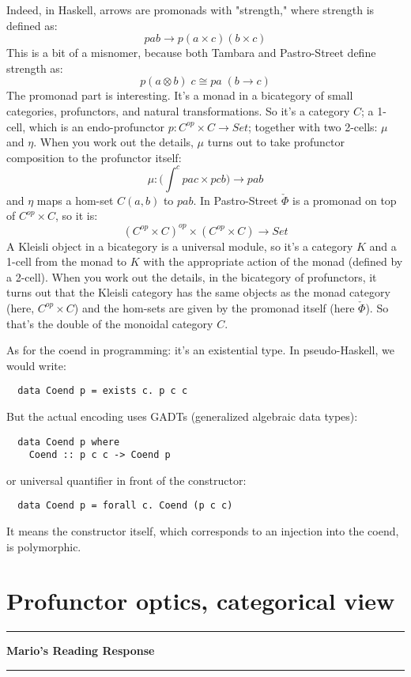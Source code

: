 \documentclass{amsart}
\newcommand{\iam}[1]{
  \vspace{0.25em}
  \hrule
  \vspace{0.25em}
  \textbf{{#1}'s Reading Response}
  \vspace{0.25em}
  \hrule
  \vspace{1em}
}
\begin{document}
Indeed, in Haskell, arrows are promonads with "strength," where strength is defined as:
\[p a b \to p (a \times c) (b \times c)\]
This is a bit of a misnomer, because both Tambara and Pastro-Street define strength as:
\[p (a \otimes b)\; c \cong p a\; (b \to c)\]
The promonad part is interesting. It's a monad in a bicategory of small categories, profunctors, and natural transformations. So it's a category $C$; a 1-cell, which is an endo-profunctor $p : C^{op}\times C \to Set$; together with two 2-cells: $\mu$ and $\eta$. When you work out the details, $\mu$ turns out to take profunctor composition to the profunctor itself:
\[\mu : \Big(\int^c p a c \times p c b\Big) \to p a b\]
and $\eta$ maps a hom-set $C(a, b)$ to $p a b$. In Pastro-Street $\check{\Phi}$ is a promonad on top of $C^{op}\times C$, so it is:
\[(C^{op}\times C)^{op}\times (C^{op}\times C) \to Set\]
A Kleisli object in a bicategory is a universal module, so it's a category $K$ and a 1-cell from the monad to $K$ with the appropriate action of the monad (defined by a 2-cell). When you work out the details, in the bicategory of profunctors, it turns out that the Kleisli category has the same objects as the monad category (here, $C^{op}\times C$) and the hom-sets are given by the promonad itself (here $\check{\Phi}$). So that's the double of the monoidal category $C$.

As for the coend in programming: it's an existential type. In pseudo-Haskell, we would write:
\begin{verbatim}
  data Coend p = exists c. p c c
\end{verbatim}
But the actual encoding uses GADTs (generalized algebraic data types):
\begin{verbatim}
  data Coend p where
    Coend :: p c c -> Coend p
\end{verbatim}
or universal quantifier in front of the constructor:
\begin{verbatim}
  data Coend p = forall c. Coend (p c c)
\end{verbatim}
It means the constructor itself, which corresponds to an injection into the coend, is polymorphic. 

\section{Profunctor optics, categorical view}
\label{sec:profunctor}

\iam{Mario}
\end{document}
